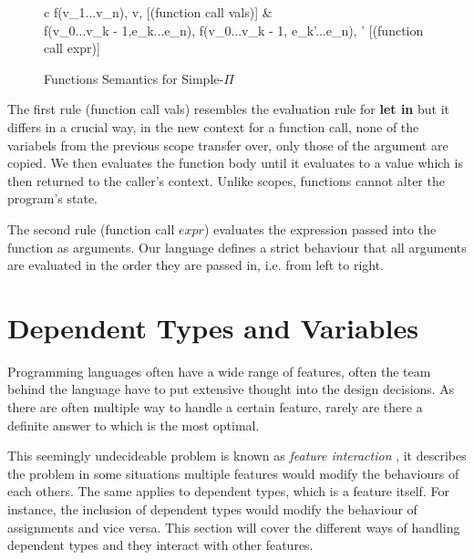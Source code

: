 \documentclass[a4paper,12pt]{report}
\begin{document}
\begin{figure}[H]
  \begin{center}
    \begin{tabular} {c}
      {\langle f(v_1...v_n), \sigma \rangle \longrightarrow \langle v, \sigma \rangle} [(function call vals)]
      & \\
      {\langle f(v_0...v_{k - 1},e_k...e_n), \sigma \rangle \longrightarrow \langle f(v_0...v_{k - 1}, e_{k}'...e_n), \sigma' \rangle} [(function call expr)]
    \end{tabular}
  \end{center}
  \caption{Functions Semantics for Simple-$\Pi$}
\end{figure}

\par
The first rule (function call vals) resembles the evaluation rule for 
\textbf{let in} but it differs in a crucial way, in the new context for a 
function call, none of the variabels from the previous scope transfer over, only 
those of the argument are copied. We then evaluates the function body until it 
evaluates to a value which is then returned to the caller's context. Unlike 
scopes, functions cannot alter the program's state. 

\par
The second rule (function call $expr$) evaluates the expression passed into the 
function as arguments. Our language defines a strict behaviour that all 
arguments are evaluated in the order they are passed in, i.e. from left to right. 

\section{Dependent Types and Variables}
Programming languages often have a wide range of features, often the team behind 
the language have to put extensive thought into the design decisions. As there 
are often multiple way to handle a certain feature, rarely are there a definite 
answer to which is the most optimal.

\par
This seemingly undecideable problem is known as \textit{feature interaction} 
\cite{featInteract}, it describes the problem in some situations multiple 
features would modify the behaviours of each others. The same applies to 
dependent types, which is a feature itself. For instance, the inclusion of dependent types 
would modify the behaviour of assignments and vice versa. This section 
will cover the different ways of handling dependent types and they interact with 
other features.
\end{document}
